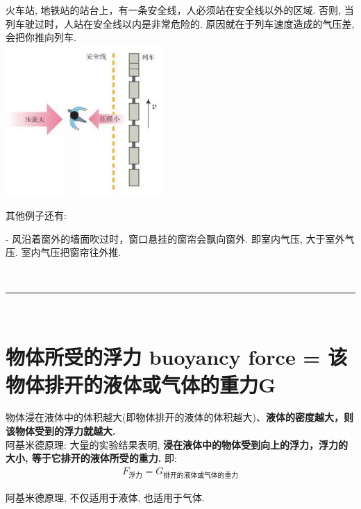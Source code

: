 \documentclass[UTF8]{ctexart}
\begin{document}
	\begin{tcolorbox}[title = {例},boxrule={0.1em},colframe={black!10}, colback={black!3},colbacktitle={black!10},coltitle={black}]
	火车站, 地铁站的站台上，有一条安全线，人必须站在安全线以外的区域. 否则, 当列车驶过时，人站在安全线以内是非常危险的. 原因就在于列车速度造成的气压差, 会把你推向列车. \\
	
	\includegraphics[width=0.45\textwidth]{img/0042.png} 
	\end{tcolorbox}


其他例子还有: 

- 风沿着窗外的墙面吹过时，窗口悬挂的窗帘会飘向窗外. 即室内气压, 大于室外气压. 室内气压把窗帘往外推.


~\\
\hrule
~\\



\section{物体所受的浮力 buoyancy force = 该物体排开的液体或气体的重力G}

物体浸在液体中的体积越大(即物体排开的液体的体积越大)、\textbf{液体的密度越大，则该物体受到的浮力就越大.} \\

阿基米德原理: 大量的实验结果表明, \textbf{浸在液体中的物体受到向上的浮力，浮力的大小, 等于它排开的液体所受的重力.} 即:
\begin{align*}
	\boxed{
	F_{\text{浮力}}=G_{\text{排开的液体或气体的重力}}	
	}
\end{align*}

阿基米德原理, 不仅适用于液体, 也适用于气体.
\end{document}
